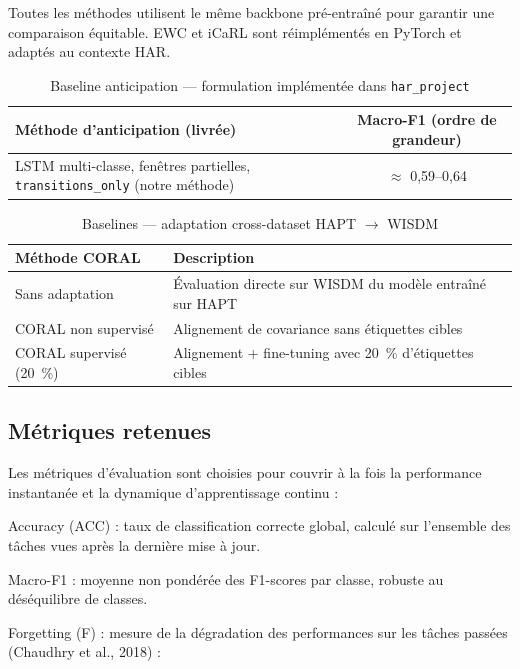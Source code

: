 Toutes les méthodes utilisent le même backbone pré-entraîné pour garantir une comparaison équitable. EWC et iCaRL sont réimplémentés en PyTorch et adaptés au contexte HAR.

\begin{table}[H]
\centering
\small
\begin{tabularx}{0.88\textwidth}{|Y|c|}
\hline
\textbf{Méthode d'anticipation (livrée)} & \textbf{Macro-F1 (ordre de grandeur)} \\
\hline
LSTM multi-classe, fenêtres partielles,
\texttt{transitions\_only} (notre méthode) & $\approx$ 0,59--0,64 \\
\hline
\end{tabularx}
\caption{Baseline anticipation — formulation implémentée dans \texttt{har\_project}}
\label{tab:baselines_anticipation}
\end{table}

\begin{table}[H]
\centering
\small
\begin{tabularx}{\textwidth}{|Y|Y|}
\hline
\textbf{Méthode CORAL} & \textbf{Description} \\
\hline
Sans adaptation & Évaluation directe sur WISDM du modèle entraîné sur HAPT \\
CORAL non supervisé & Alignement de covariance sans étiquettes cibles \\
CORAL supervisé (20~\%) & Alignement + fine-tuning avec 20~\% d'étiquettes cibles \\
\hline
\end{tabularx}
\caption{Baselines — adaptation cross-dataset HAPT $\rightarrow$ WISDM}
\label{tab:baselines_coral}
\end{table}

\subsection{Métriques retenues}

Les métriques d'évaluation sont choisies pour couvrir à la fois la performance instantanée et la dynamique d'apprentissage continu :

Accuracy (ACC) : taux de classification correcte global, calculé sur l'ensemble des tâches vues après la dernière mise à jour.

Macro-F1 : moyenne non pondérée des F1-scores par classe, robuste au déséquilibre de classes.

Forgetting (F) : mesure de la dégradation des performances sur les tâches passées (Chaudhry et al., 2018) :

